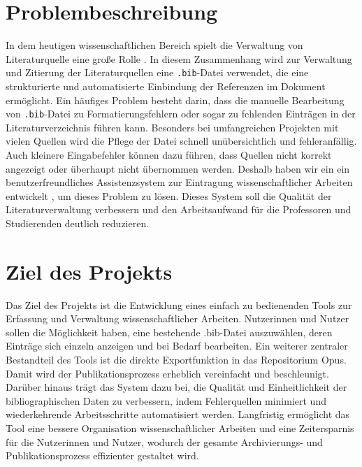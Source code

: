 \section{Problembeschreibung}
In dem  heutigen wissenschaftlichen Bereich spielt die Verwaltung von Literaturquelle eine große Rolle .
In diesem Zusammenhang wird zur Verwaltung und Zitierung der Literaturquellen eine \texttt{.bib}-Datei verwendet,
 die eine strukturierte und automatisierte Einbindung der Referenzen im Dokument ermöglicht.
Ein häufiges Problem besteht darin, dass die manuelle Bearbeitung von \texttt{.bib}-Datei zu 
 Formatierungsfehlern oder sogar zu fehlenden Einträgen in der Literaturverzeichnis führen kann.
Besonders bei umfangreichen Projekten mit vielen Quellen wird die Pflege der Datei schnell unübersichtlich und fehleranfällig.
Auch kleinere Eingabefehler können dazu führen, dass Quellen nicht korrekt angezeigt oder überhaupt nicht übernommen werden.
Deshalb haben wir ein ein benutzerfreundliches Assistenzsystem zur Eintragung wissenschaftlicher Arbeiten entwickelt ,
 um dieses Problem zu lösen.
 Dieses System soll die Qualität der Literaturverwaltung verbessern und den Arbeitsaufwand für die Professoren und 
 Studierenden deutlich reduzieren.



\section{Ziel des Projekts}
Das Ziel des Projekts ist die Entwicklung eines einfach zu bedienenden 
Tools zur Erfassung und Verwaltung wissenschaftlicher Arbeiten. 
Nutzerinnen und Nutzer sollen die Möglichkeit haben, eine bestehende 
.bib-Datei auszuwählen, deren Einträge sich einzeln anzeigen und bei 
Bedarf bearbeiten. Ein weiterer zentraler Bestandteil des Tools ist die direkte Exportfunktion
in das Repositorium Opus. Damit wird der Publikationsprozess erheblich 
vereinfacht und beschleunigt. Darüber hinaus trägt das System dazu bei, 
die Qualität und Einheitlichkeit der bibliographischen Daten zu verbessern,
indem Fehlerquellen minimiert und wiederkehrende Arbeitsschritte 
automatisiert werden. Langfristig ermöglicht das Tool eine bessere Organisation 
wissenschaftlicher Arbeiten und eine Zeitersparnis für die 
Nutzerinnen und Nutzer, wodurch der gesamte Archivierungs- 
und Publikationsprozess effizienter gestaltet wird.

